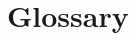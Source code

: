 \chapter{Glossary}

\footnotesize
\SingleSpacing

\begin{multicols}{2}
\begin{acronym}[AAAAAA]


\end{acronym}
\end{multicols}
